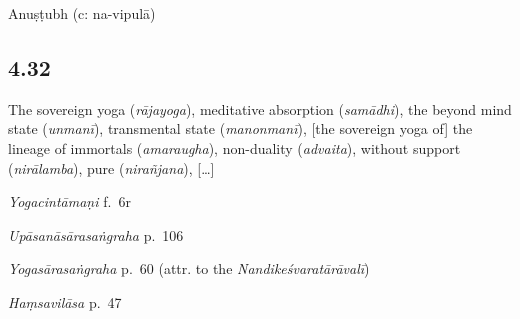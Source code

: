 \begin{ekdosis}
\begin{philcomm}[hp04_031]
\end{philcomm}

\begin{metre}[hp04_031]
Anuṣṭubh (c: na-vipulā)
\end{metre}

\subsection*{4.32}
\begin{translation}[hp04_032]
The sovereign yoga (\emph{rājayoga}), meditative absorption (\emph{samādhi}), the beyond mind state (\emph{unmanī}), transmental state (\textit{manonmanī}), [the sovereign yoga of] the lineage of immortals (\emph{amaraugha}), non-duality (\emph{advaita}), without support (\emph{nirālamba}), pure (\emph{nirañjana}), [\dots]
\end{translation}
% 


\begin{testimonia}[hp04_032]
\emph{Yogacintāmaṇi} f.~6r
\begin{versinnote}
\end{versinnote}

\emph{Upāsanāsārasaṅgraha} p.~106
\begin{versinnote}
\end{versinnote}

\emph{Yogasārasaṅgraha} p.~60 (attr. to the \emph{Nandikeśvaratārāvalī})
\begin{versinnote}
\end{versinnote}

\emph{Haṃsavilāsa} p.~47
\begin{versinnote}
\end{versinnote}
\end{testimonia}


\end{ekdosis}
